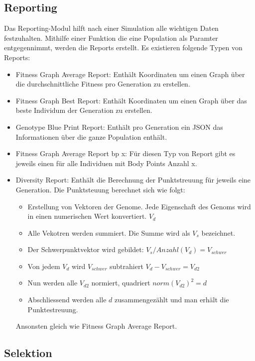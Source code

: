    \subsection{Reporting}
    \label{subsec:Reporting}
      Das Reporting-Modul hilft nach einer Simulation alle wichtigen Daten festzuhalten. Mithilfe einer Funktion die eine Population als Paramter entgegennimmt,
      werden die Reports erstellt. Es existieren folgende Typen von Reports:
      \begin{itemize}
        \item Fitness Graph Average Report: Enthält Koordinaten um einen Graph über die durchschnittliche Fitness pro Generation zu erstellen.
        \item Fitness Graph Best Report: Enthält Koordinaten um einen Graph über das beste Individum der Generation zu erstellen.
        \item Genotype Blue Print Report: Enthält pro Generation ein JSON das Informationen über die ganze Population enthält.
        \item Fitness Graph Average Report bp x: Für diesen Typ von Report gibt es jeweils einen für alle Individuen mit Body Points Anzahl x.
        \item Diversity Report: Enthält die Berechnung der Punktstreuung für jeweils eine Generation. Die Punktsteuung berechnet sich wie folgt:
        \begin{itemize}
          \item Erstellung von Vektoren der Genome. Jede Eigenschaft des Genoms wird in einen numerischen Wert konvertiert. \( V_d \)
          \item Alle Vekotren werden summiert.  Die Summe wird als \(V_s\) bezeichnet.
          \item Der Schwerpunktvektor wird gebildet: \( V_s / Anzahl(V_d) = V_{schwer} \)
          \item Von jedem \(V_d\) wird \(V_{schwer}\) subtrahiert  \( V_d - V_{schwer}  = V_{d2} \)
          \item Nun werden alle \(V_{d2}\) normiert, quadriert \( norm(V_{d2})^2 = d \)
          \item Abschliessend werden alle \(d\) zusammengezählt und man erhält die Punktestreuung.
        \end{itemize}
        Ansonsten gleich wie Fitness Graph Average Report.
      \end{itemize}


    \subsection{Selektion\label{sec:Selektion}}

